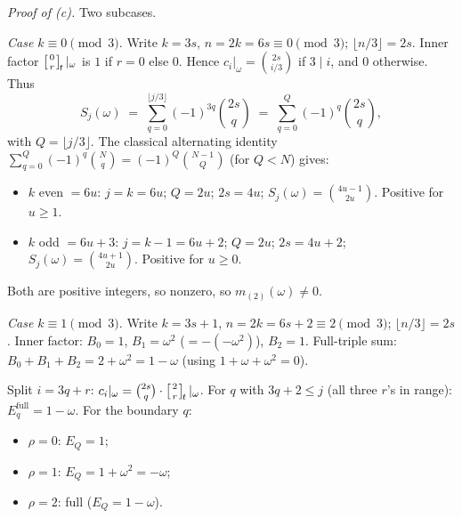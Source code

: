 \documentclass[11pt]{article}
\theoremstyle{definition}
\theoremstyle{remark}
\newcommand{\qbinom}[2]{\left[{#1 \atop #2}\right]_{\!t}}
\begin{document}
\medskip
\emph{Proof of (c).} Two subcases.

\smallskip
\emph{Case $k \equiv 0 \pmod 3$.} Write $k = 3s$, $n = 2k = 6s \equiv 0 \pmod 3$; $\lfloor n/3 \rfloor = 2s$.
Inner factor $\qbinom{0}{r}|_\omega$ is $1$ if $r = 0$ else $0$. Hence
$c_i|_\omega = \binom{2s}{i/3}$ if $3 \mid i$, and $0$ otherwise. Thus
\[
S_j(\omega) \;=\; \sum_{q=0}^{\lfloor j/3 \rfloor} (-1)^{3q} \binom{2s}{q}
\;=\; \sum_{q=0}^{Q} (-1)^{q} \binom{2s}{q},
\]
with $Q = \lfloor j/3\rfloor$. The classical alternating identity
$\sum_{q=0}^{Q}(-1)^q \binom{N}{q} = (-1)^Q \binom{N-1}{Q}$ (for $Q < N$)
gives:
\begin{itemize}
\item $k$ even $= 6u$: $j = k = 6u$; $Q = 2u$; $2s = 4u$; $S_j(\omega) = \binom{4u-1}{2u}$. Positive for $u \ge 1$.
\item $k$ odd $= 6u + 3$: $j = k-1 = 6u+2$; $Q = 2u$; $2s = 4u+2$; $S_j(\omega) = \binom{4u+1}{2u}$. Positive for $u \ge 0$.
\end{itemize}
Both are positive integers, so nonzero, so $m_{(2)}(\omega) \ne 0$.

\smallskip
\emph{Case $k \equiv 1 \pmod 3$.} Write $k = 3s + 1$, $n = 2k = 6s+2 \equiv 2 \pmod 3$; $\lfloor n/3 \rfloor = 2s$.
Inner factor: $B_0 = 1$, $B_1 = \omega^2$ ($= -(-\omega^2)$),
$B_2 = 1$. Full-triple sum: $B_0 + B_1 + B_2 = 2 + \omega^2 = 1 - \omega$
(using $1 + \omega + \omega^2 = 0$).

Split $i = 3q + r$: $c_i|_\omega = \binom{2s}{q} \cdot \qbinom{2}{r}|_\omega$.
For $q$ with $3q + 2 \le j$ (all three $r$'s in range): $E_q^{\text{full}} = 1 - \omega$.
For the boundary $q$:
\begin{itemize}
\item $\rho = 0$: $E_Q = 1$;
\item $\rho = 1$: $E_Q = 1 + \omega^2 = -\omega$;
\item $\rho = 2$: full ($E_Q = 1 - \omega$).
\end{itemize}
\end{document}
